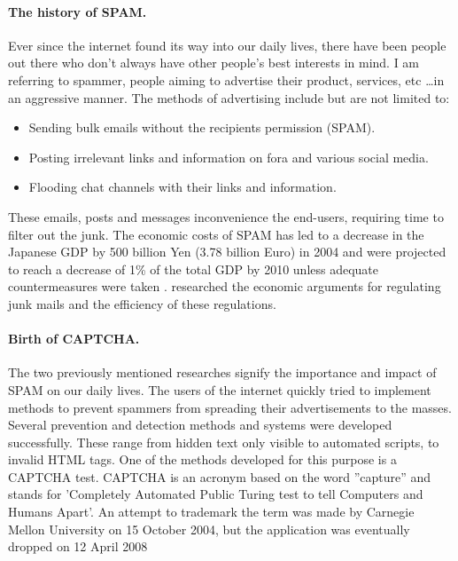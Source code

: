 \documentclass[pdftex,a4paper,12pt,twoside]{report}
\begin{document}
\paragraph{The history of SPAM.} 
Ever since the internet found its way into our daily lives, there have been people out there who don't always have other people's best interests in mind. I am referring to spammer, people aiming to advertise their product, services, etc \ldots in an aggressive manner. The methods of advertising include but are not limited to: \begin{itemize}
\item Sending bulk emails without the recipients permission (SPAM). 
\item Posting irrelevant links and information on fora and various social media.
\item Flooding chat channels with their links and information. 
\end{itemize}
These emails, posts and messages inconvenience the end-users, requiring time to filter out the junk. The economic costs of SPAM has led to a decrease in the Japanese GDP by 500 billion Yen (3.78 billion Euro) in 2004 and were projected to reach a decrease of 1\% of the total GDP by 2010 unless adequate countermeasures were taken \citep{Ukai2007}. \citep{Khong2004} researched the economic arguments for regulating junk mails and the efficiency of these regulations.
\paragraph{Birth of CAPTCHA.} 
The two previously mentioned researches signify the importance and impact of SPAM on our daily lives. The users of the internet quickly tried to implement methods to prevent spammers from spreading their advertisements to the masses. Several prevention and detection methods and systems were developed successfully. These range from hidden text only visible to automated scripts, to invalid HTML tags. One of the methods developed for this purpose is a CAPTCHA test. CAPTCHA is an acronym based on the word ''capture'' and stands for 'Completely Automated Public Turing test to tell Computers and Humans Apart'. An attempt to trademark  the term was made by Carnegie Mellon University on 15 October 2004, but the application was eventually dropped on 12 April 2008
\end{document}
